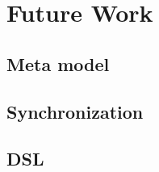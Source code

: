 \section{Future Work}
\label{sec:future_work}
\subsection{Meta model}
\subsection{Synchronization}
\subsection{DSL}